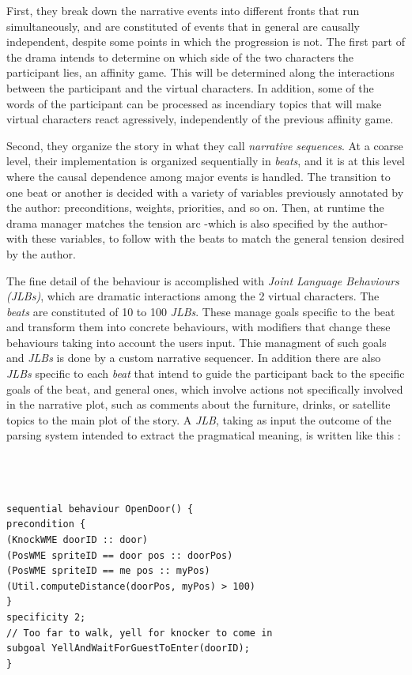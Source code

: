 \documentclass[
		twoside,openright,titlepage,numbers=noenddot,manychapters,
		headinclude,%
                footinclude=false,cleardoublepage=empty,
                BCOR=5mm,
		fontsize=11pt, %
                 enabledeprecatedfontcommands]{scrreprt}
\begin{document}
First, they break down the narrative events into different fronts that run simultaneously, and are constituted of events that in general are causally independent, despite some points in which the progression is not. The first part of the drama intends to determine on which side of the two characters the participant lies, an affinity game. This will be determined along the interactions between the participant and the virtual characters. In addition, some of the words of the participant can be processed as  incendiary topics that will make virtual characters react agressively, independently of the previous affinity game.

Second, they organize the story in what they call \emph{narrative sequences}.  At a coarse level, their implementation is organized sequentially in \emph{beats}, and it is at this level where the causal dependence among major events is handled. The transition to one beat or another is decided with a variety of variables previously annotated by the author: preconditions, weights, priorities, and so on. Then, at runtime the drama manager matches the tension arc -which is also specified by the author- with these variables, to follow with the beats to match the general tension desired by the author.

The fine detail of the behaviour is accomplished with \emph{Joint Language Behaviours (JLBs)}, which are dramatic interactions among the 2 virtual characters.  The \emph{beats} are constituted of 10 to 100 \emph{JLBs}. These manage goals specific to the beat and transform them into concrete behaviours, with modifiers that change these behaviours taking into account the users input. Thie managment of such goals and \emph{JLBs} is done by  a custom narrative sequencer. In addition there are also \emph{JLBs} specific to each \emph{beat} that intend to guide the participant back to the specific goals of the beat, and general ones, which involve actions not specifically involved in the narrative plot, such as comments about the furniture, drinks, or satellite topics to the main plot of the story.   A \emph{JLB}, taking as input the outcome of the parsing system intended to extract the pragmatical meaning, is written like this \cite[]{mateas2004behavior}:
\\ \
\\ \
\\ \
\begin{lstlisting}
sequential behaviour OpenDoor() {
precondition {
(KnockWME doorID :: door)
(PosWME spriteID == door pos :: doorPos)
(PosWME spriteID == me pos :: myPos)
(Util.computeDistance(doorPos, myPos) > 100)
}
specificity 2;
// Too far to walk, yell for knocker to come in
subgoal YellAndWaitForGuestToEnter(doorID);
}
\end{lstlisting}
\end{document}

